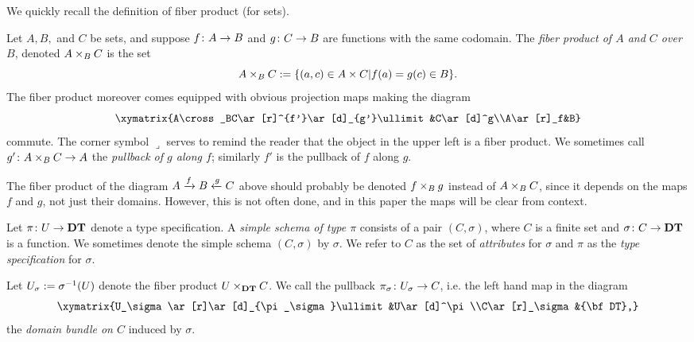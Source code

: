 \documentclass{amsart}
\def\DT{{\bf DT}}
\def\C{\check{\tn{C}}}
\begin{document}
We quickly recall the definition of fiber product (for sets).

\begin{definition}

Let $A, B,$ and $C$ be sets, and suppose $f\colon A\rightarrow B$ and $g\colon C\rightarrow B$ are functions with the same codomain.  The {\em fiber product of $A$ and $C$ over $B$}, denoted $A\times_BC$ is the set $$A\times_BC:=\{(a,c)\in A\times C | f(a)=g(c)\in B\}.$$  The fiber product moreover comes equipped with obvious projection maps making the diagram $$\xymatrix{A\cross_BC\ar[r]^{f'}\ar[d]_{g'}\ullimit&C\ar[d]^g\\A\ar[r]_f&B}$$ commute.  The corner symbol $\lrcorner$ serves to remind the reader that the object in the upper left is a fiber product.   We sometimes call $g'\colon A\times_BC\rightarrow A$ the {\em pullback of $g$ along $f$}; similarly $f'$ is the pullback of $f$ along $g$.

\end{definition}

\begin{remark}

The fiber product of the diagram $A\xrightarrow{f}B\xleftarrow{g}C$ above should probably be denoted $f\times_Bg$ instead of $A\times_BC$, since it depends on the maps $f$ and $g$, not just their domains.  However, this is not often done, and in this paper the maps will be clear from context.

\end{remark}

\begin{definition}\label{def:simple schema}

Let $\pi\taking U\to\DT$ denote a type specification.  A {\em simple schema of type $\pi$} consists of a pair $(C,\sigma)$, where $C$ is a finite set and $\sigma\taking C\to\DT$ is a function.   We sometimes denote the simple schema $(C,\sigma)$ by $\sigma$.  We refer to $C$ as the set of {\em attributes} for $\sigma$ and $\pi$ as the {\em type specification} for $\sigma$.

Let $U_\sigma:=\sigma^\m1(U)$ denote the fiber product $U\cross_\DT C$.  We call the pullback $\pi_\sigma\colon U_\sigma\rightarrow C$, i.e. the left hand map in the diagram $$\xymatrix{U_\sigma\ar[r]\ar[d]_{\pi_\sigma}\ullimit&U\ar[d]^\pi\\C\ar[r]_\sigma&\DT,}$$ the {\em domain bundle on $C$} induced by $\sigma$.

\end{definition}
\end{document}
